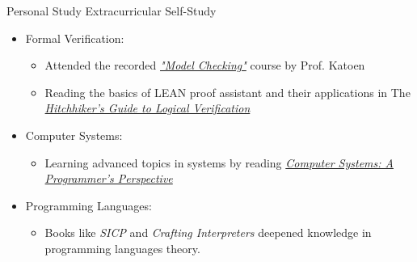 \begin{cventries}
  \cventry
  {Personal Study} %
  {Extracurricular Self-Study} %
  {} %
  {} %
  {
    \begin{cvitems} %
      \begin{itemize}
      \item  Formal Verification: \newline
          \begin{itemize}
          \item Attended the recorded \href{https://www.youtube.com/playlist?list=PLwabKnOFhE38C0o6z_bhlF_uOUlblDTjh}{\textit{"Model Checking"}} course by Prof. Katoen
            \newline
          \item Reading the basics of LEAN proof assistant and their
          applications in The \href{https://github.com/blanchette/logical_verification_2023}{\textit{Hitchhiker’s Guide to Logical Verification}}
        \end{itemize}
      \item Computer Systems:
        \begin{itemize}
          \item Learning advanced topics in systems by reading
        \href{http://csapp.cs.cmu.edu/2e/samples.html}{\textit{
            Computer Systems: A Programmer's Perspective}}
        \end{itemize}
      \item Programming Languages:
        \begin{itemize}
        \item Books like \textit{SICP} and \textit{Crafting Interpreters} deepened knowledge in programming languages theory.
        \end{itemize}
        \end{itemize}
    \end{cvitems}
  }

\end{cventries}
